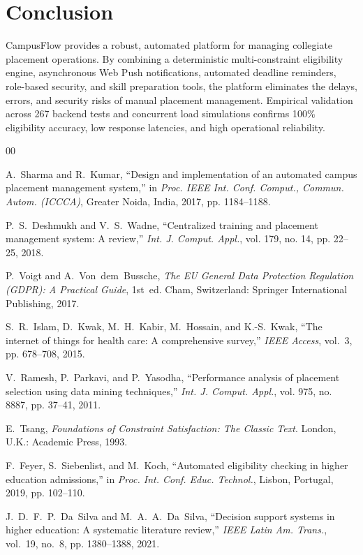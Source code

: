 \documentclass[conference]{IEEEtran}
\begin{document}
\section{Conclusion}
CampusFlow provides a robust, automated platform for managing collegiate placement operations. By combining a deterministic multi-constraint eligibility engine, asynchronous Web Push notifications, automated deadline reminders, role-based security, and skill preparation tools, the platform eliminates the delays, errors, and security risks of manual placement management. Empirical validation across 267 backend tests and concurrent load simulations confirms 100\% eligibility accuracy, low response latencies, and high operational reliability.

\begin{thebibliography}{00}

A.~Sharma and R.~Kumar, ``Design and implementation of an automated campus placement management system,'' in \emph{Proc. IEEE Int. Conf. Comput., Commun. Autom. (ICCCA)}, Greater Noida, India, 2017, pp. 1184--1188.

P.~S.~Deshmukh and V.~S.~Wadne, ``Centralized training and placement management system: A review,'' \emph{Int. J. Comput. Appl.}, vol. 179, no. 14, pp. 22--25, 2018.

P.~Voigt and A.~Von~dem~Bussche, \emph{The EU General Data Protection Regulation (GDPR): A Practical Guide}, 1st~ed. Cham, Switzerland: Springer International Publishing, 2017.

S.~R.~Islam, D.~Kwak, M.~H.~Kabir, M.~Hossain, and K.-S.~Kwak, ``The internet of things for health care: A comprehensive survey,'' \emph{IEEE Access}, vol.~3, pp. 678--708, 2015.

V.~Ramesh, P.~Parkavi, and P.~Yasodha, ``Performance analysis of placement selection using data mining techniques,'' \emph{Int. J. Comput. Appl.}, vol. 975, no. 8887, pp. 37--41, 2011.

E.~Tsang, \emph{Foundations of Constraint Satisfaction: The Classic Text}. London, U.K.: Academic Press, 1993.

F.~Feyer, S.~Siebenlist, and M.~Koch, ``Automated eligibility checking in higher education admissions,'' in \emph{Proc. Int. Conf. Educ. Technol.}, Lisbon, Portugal, 2019, pp. 102--110.

J.~D.~F.~P.~Da~Silva and M.~A.~A.~Da~Silva, ``Decision support systems in higher education: A systematic literature review,'' \emph{IEEE Latin Am. Trans.}, vol.~19, no.~8, pp. 1380--1388, 2021.


\end{thebibliography}
\end{document}
